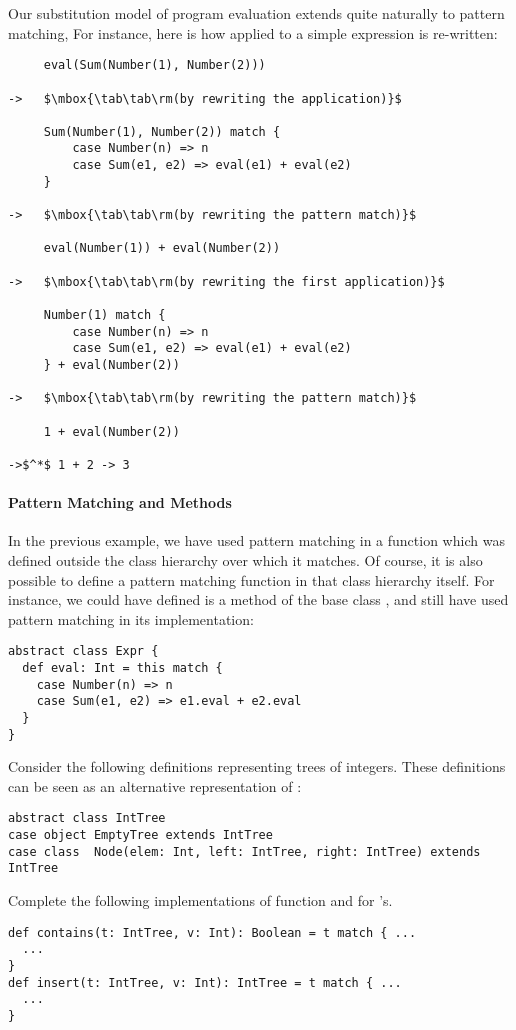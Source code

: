 \example Our substitution model of program evaluation extends quite naturally to pattern matching, For instance, here is how  applied to a simple expression is re-written:
\begin{lstlisting}
     eval(Sum(Number(1), Number(2)))

->   $\mbox{\tab\tab\rm(by rewriting the application)}$

     Sum(Number(1), Number(2)) match {
         case Number(n) => n
         case Sum(e1, e2) => eval(e1) + eval(e2)
     }

->   $\mbox{\tab\tab\rm(by rewriting the pattern match)}$

     eval(Number(1)) + eval(Number(2))

->   $\mbox{\tab\tab\rm(by rewriting the first application)}$

     Number(1) match {
         case Number(n) => n
         case Sum(e1, e2) => eval(e1) + eval(e2)
     } + eval(Number(2))

->   $\mbox{\tab\tab\rm(by rewriting the pattern match)}$

     1 + eval(Number(2))

->$^*$ 1 + 2 -> 3
\end{lstlisting}

\paragraph{Pattern Matching and Methods}
In the previous example, we have used pattern
matching in a function which was defined outside the class hierarchy
over which it matches.  Of course, it is also possible to define a
pattern matching function in that class hierarchy itself. For
instance, we could have defined
 is a method of the base class , and still have used pattern matching in its implementation:
\begin{lstlisting}
abstract class Expr { 
  def eval: Int = this match {
    case Number(n) => n
    case Sum(e1, e2) => e1.eval + e2.eval 
  } 
}
\end{lstlisting}

\begin{exercise} Consider the following definitions representing trees
of integers.  These definitions can be seen as an alternative
representation of :
\begin{lstlisting}
abstract class IntTree
case object EmptyTree extends IntTree
case class  Node(elem: Int, left: IntTree, right: IntTree) extends IntTree
\end{lstlisting}
Complete the following implementations of function  and  for 
's.
\begin{lstlisting}
def contains(t: IntTree, v: Int): Boolean = t match { ...
  ...
}
def insert(t: IntTree, v: Int): IntTree = t match { ...
  ...
}
\end{lstlisting}
\end{exercise}


